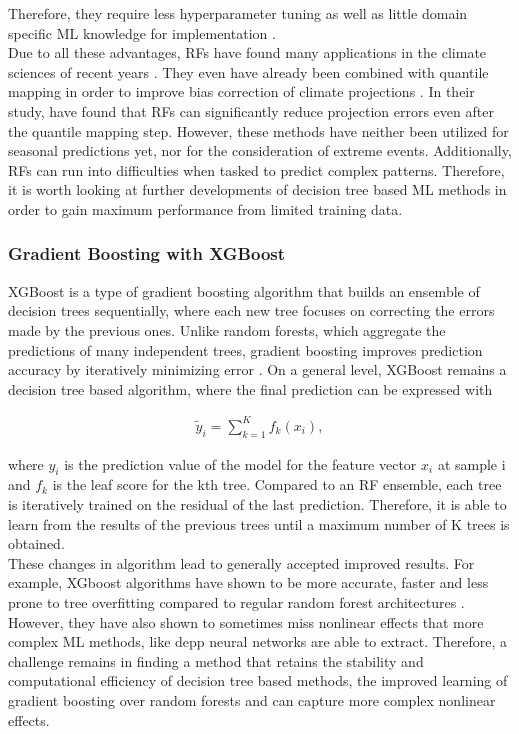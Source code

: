 \documentclass[ba-lentz.tex]{subfile}
\begin{document}
Therefore, they require less hyperparameter tuning as well as little domain specific ML knowledge for implementation \parencite{louppe_understanding_2014}. \\
Due to all these advantages, RFs have found many applications in the climate sciences of recent years \parencite{das_evaluation_2022,valecha_prediction_2018}.
They even have already been combined with quantile mapping in order to improve bias correction of climate projections \parencite{raeesi_using_2024}.
In their study, \cite{raeesi_using_2024} have found that RFs can significantly reduce projection errors even after the quantile mapping step.
However, these methods have neither been utilized for seasonal predictions yet, nor for the consideration of extreme events.
Additionally, RFs can run into difficulties when tasked to predict complex patterns.
Therefore, it is worth looking at further developments of decision tree based ML methods in order to gain maximum performance from limited training data.

\subsubsection{Gradient Boosting with XGBoost}

XGBoost is a type of gradient boosting algorithm that builds an ensemble of decision trees sequentially, where each new tree focuses on correcting the errors made by the previous ones.
Unlike random forests, which aggregate the predictions of many independent trees, gradient boosting improves prediction accuracy by iteratively minimizing error \parencite{karsisto_post-processing_2025}.
On a general level, XGBoost remains a decision tree based algorithm, where the final prediction can be expressed with

\begin{align}
    \tilde{y}_i = \sum_{k=1}^{K} f_k(x_i) ,
\end{align}

where $y_i$ is the prediction value of the model for the feature vector $x_i$ at sample i and $f_k$ is the leaf score for the kth tree.
Compared to an RF ensemble, each tree is  iteratively trained on the residual of the last prediction.
Therefore, it is able to learn from the results of the previous trees until a maximum number of K trees is obtained. \\
These changes in algorithm lead to generally accepted improved results.
For example, XGboost algorithms have shown to be more accurate, faster and less prone to tree overfitting compared to regular random forest architectures \parencite{chen_xgboost_2016}.
However, they have also shown to sometimes miss nonlinear effects that more complex ML methods, like depp neural networks are able to extract.
Therefore, a challenge remains in finding a method that retains the stability and computational efficiency of decision tree based methods, the improved learning of gradient boosting over random forests and can capture more complex nonlinear effects.
\end{document}

